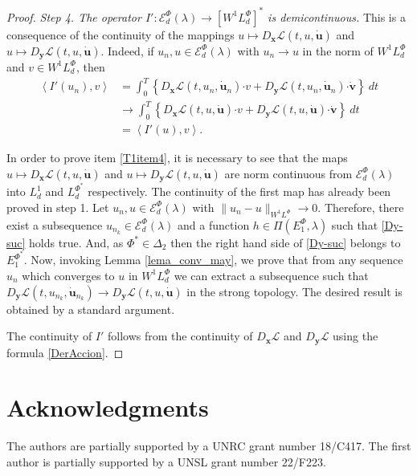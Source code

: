 \documentclass[twoside]{article}
\theoremstyle{remark}
\newcommand{\lphi}{L^{\Phi}}
\newcommand{\lpsi}{L^{\Phi^*}}
\newcommand{\ephi}{E^{\Phi}}
\newcommand{\wphi}{W^{1}\lphi}
\newcommand{\sobnor}{\|_{W^{1}\lphi}}
\newcommand{\domi}{\mathcal{E}^{\Phi}_d(\lambda)}
\renewcommand{\b}[1]{\boldsymbol{#1}}
\newcommand{\ccdot}{\b{\cdot}}
\newcommand{\epsi}{E^{\Phie}}
\newcommand{\Phie}{\Phi^{*}}
\begin{document}
\begin{proof}
\emph{Step 4. The operator $I':\domi  \to \left[\wphi_d
\right]^* $ is demicontinuous.}
This is a consequence  of the continuity of the mappings $u \mapsto D_{\b{x}}\mathcal{L}(t,u,\b{\dot{u}})$ and $u \mapsto
D_{\b{y}}\mathcal{L}(t,u,\b{\dot{u}})$. Indeed, if $u_n,u\in \domi$ with $u_n\to u$ in the norm of $\wphi_d$ and $v \in
\wphi_d$, then
\[
\begin{split}
\left\langle  I'(u_{n}),v \right\rangle &= \int_0^T \left\{  D_{\b{x}}\mathcal{L}\left(t,u_n,\b{\dot{u}}_n\right)\ccdot
v +
 D_{\b{y}}\mathcal{L}\left(t,u_n,\b{\dot{u}}_n\right)\ccdot\b{\dot{v}}\right\} \ dt\\
&\rightarrow \int_0^T \left\{ D_{\b{x}}\mathcal{L}\left(t,u,\b{\dot{u}}\right)\ccdot v+
D_{\b{y}}\mathcal{L}\left(t,u,\b{\dot{u}}\right)\ccdot\b{\dot{v}}\right\} \ dt\\
&=\left\langle  I'(u),v \right\rangle.
\end{split}
\]


In order to prove item  \ref{T1item4}, it is necessary to see that the maps $u\mapsto D_{\b{x}}\mathcal{L}(t,u,\b{\dot{u}})$  and $u\mapsto D_{\b{y}}\mathcal{L}(t,u,\b{\dot{u}})$  are norm continuous
from $\domi $ into $L^1_d$ and
 $\lpsi_d$ respectively.  The continuity of the first map has already been proved in step 1. 
Let $u_n, u \in \domi$ with $\|u_n- u\sobnor\to 0$. Therefore,   there exist a subsequence $u_{n_k}\in \domi$ and a function $h\in\Pi(\ephi_1,\lambda)$  such that   \eqref{Dy-suc} holds true.
And, as  $\Phie\in\Delta_2$ then   the right hand side of  \eqref{Dy-suc} belongs to $\epsi_1$.
Now, invoking  Lemma \ref{lema_conv_may}, we  prove that
  from any sequence $u_n$ which converges to $u$ in $\wphi_d$ we can
extract a subsequence such that   $D_{\b{y}}\mathcal{L}(t,u_{n_k},\b{\dot{u}}_{n_k})\to D_{\b{y}}\mathcal{L}(t,u,\b{\dot{u}})$ in the strong topology. The desired result is obtained by a standard argument.

The continuity of $I'$  follows  from the continuity 
of $D_{\b{x}}\mathcal{L}$ and $D_{\b{y}}\mathcal{L}$ using the formula \eqref{DerAccion}.
\end{proof}





\section*{Acknowledgments}
The authors are partially supported by a UNRC grant number 18/C417. The first author is  partially supported by a  UNSL grant number 22/F223. 




 
 
\end{document}
